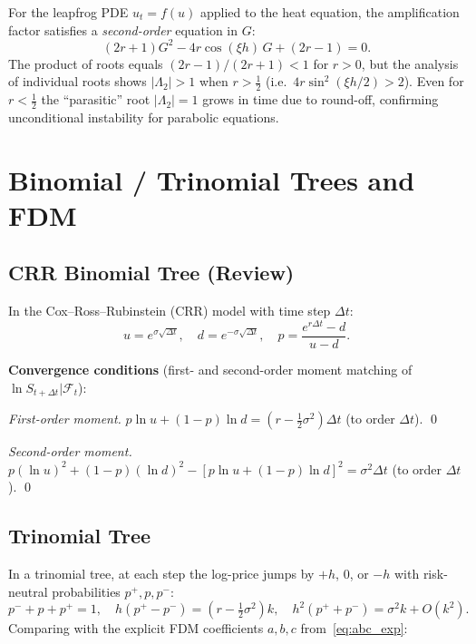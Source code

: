 \documentclass[12pt,a4paper]{article}
\theoremstyle{plain}
\theoremstyle{definition}
\theoremstyle{remark}
\newcommand{\dt}{\Delta t}
\newcommand{\OO}[1]{O\!\left(#1\right)}
\begin{document}
For the leapfrog PDE $u_{t}=f(u)$ applied to the heat equation, the
amplification factor satisfies a \emph{second-order} equation in $G$:
\[
  (2r+1)G^{2}-4r\cos(\xi h)\,G+(2r-1)=0.
\]
The product of roots equals $(2r-1)/(2r+1)<1$ for $r>0$, but the
analysis of individual roots shows $|\Lambda_{2}|>1$ when
$r>\tfrac{1}{2}$ (i.e.\ $4r\sin^{2}(\xi h/2)>2$).  Even for
$r<\tfrac{1}{2}$ the ``parasitic'' root $|\Lambda_{2}|=1$ grows
in time due to round-off, confirming unconditional instability for
parabolic equations.

\section{Binomial / Trinomial Trees and FDM}

\subsection{CRR Binomial Tree (Review)}

In the Cox--Ross--Rubinstein (CRR) model with time step $\dt$:
\[
  u=e^{\sigma\sqrt{\dt}},\quad d=e^{-\sigma\sqrt{\dt}},
  \quad p=\frac{e^{r\dt}-d}{u-d}.
\]

\textbf{Convergence conditions} (first- and second-order moment matching
of $\ln S_{t+\dt}|\mathcal{F}_{t}$):

\begin{proof}[First-order moment]
$p\ln u+(1-p)\ln d = (r-\tfrac{1}{2}\sigma^{2})\dt$\; (to order $\dt$). \qed
\end{proof}
\begin{proof}[Second-order moment]
$p(\ln u)^{2}+(1-p)(\ln d)^{2}-[p\ln u+(1-p)\ln d]^{2}=\sigma^{2}\dt$
\;(to order $\dt$). \qed
\end{proof}

\subsection{Trinomial Tree}

In a trinomial tree, at each step the log-price jumps by $+h$, $0$,
or $-h$ with risk-neutral probabilities $p^{+},p,p^{-}$:
\[
  p^{-}+p+p^{+}=1,\quad
  h(p^{+}-p^{-})=\left(r-\tfrac{1}{2}\sigma^{2}\right)k,\quad
  h^{2}(p^{+}+p^{-})=\sigma^{2}k+\OO{k^{2}}.
\]
Comparing with the explicit FDM coefficients $a,b,c$
from~\eqref{eq:abc_exp}:
\end{document}
